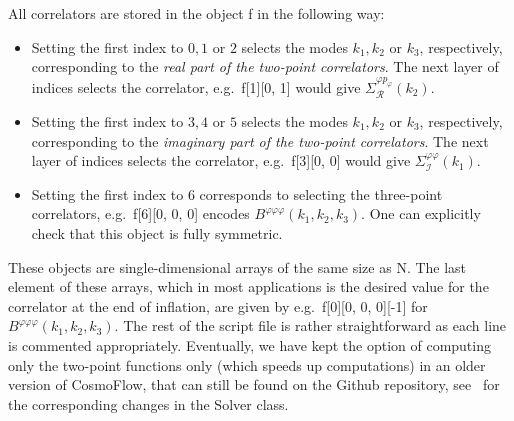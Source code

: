 \documentclass[11pt]{article}
\numberwithin{equation}{section} %
\def \Re {\mathcal{R}}
\def \Im {\mathcal{I}}
\begin{document}
\vskip 4pt
All correlators are stored in the object \textsf{f} in the following way:
\begin{itemize}
    \item Setting the first index to $0, 1$ or $2$ selects the modes $k_1, k_2$ or $k_3$, respectively, corresponding to the \textit{real part of the two-point correlators}. The next layer of indices selects the correlator, e.g.~\textsf{f[1][0, 1]} would give $\Sigma_\Re^{\varphi p_\varphi}(k_2)$.
    \item Setting the first index to $3, 4$ or $5$ selects the modes $k_1, k_2$ or $k_3$, respectively, corresponding to the \textit{imaginary part of the two-point correlators}. The next layer of indices selects the correlator, e.g.~\textsf{f[3][0, 0]} would give $\Sigma_\Im^{\varphi \varphi}(k_1)$.
    \item Setting the first index to $6$ corresponds to selecting the three-point correlators, e.g.~\textsf{f[6][0, 0, 0]} encodes $B^{\varphi\varphi\varphi}(k_1, k_2, k_3)$. One can explicitly check that this object is fully symmetric. 
\end{itemize}
These objects are single-dimensional arrays of the same size as \textsf{N}. The last element of these arrays, which in most applications is the desired value for the correlator at the end of inflation, are given by e.g.~\textsf{f[0][0, 0, 0][-1]} for $B^{\varphi\varphi\varphi}(k_1, k_2, k_3)$. The rest of the script file is rather straightforward as each line is commented appropriately. Eventually, we have kept the option of computing only the two-point functions only (which speeds up computations) in an older version of \textsf{CosmoFlow}, that can still be found on the Github repository, see~\href{https://github.com/deniswerth/CosmoFlow/blob/main/CosmoFlow/PiSigma/solver.py}{\faGithub} for the corresponding changes in the \textsf{Solver} class.
\end{document}
